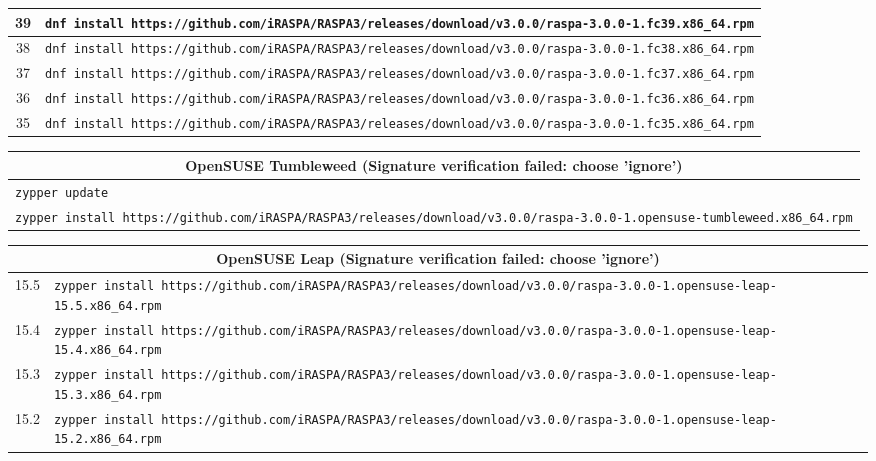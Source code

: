 \begin{table}[p]
\begin{tabularx}{\linewidth}{c|X}
     \hline
  39 & \verb+dnf install https://github.com/iRASPA/RASPA3/releases/download/v3.0.0/raspa-3.0.0-1.fc39.x86_64.rpm+\\
     \hline
  38 & \verb+dnf install https://github.com/iRASPA/RASPA3/releases/download/v3.0.0/raspa-3.0.0-1.fc38.x86_64.rpm+\\
     \hline
  37 & \verb+dnf install https://github.com/iRASPA/RASPA3/releases/download/v3.0.0/raspa-3.0.0-1.fc37.x86_64.rpm+\\
     \hline
  36 & \verb+dnf install https://github.com/iRASPA/RASPA3/releases/download/v3.0.0/raspa-3.0.0-1.fc36.x86_64.rpm+\\
     \hline
  35 & \verb+dnf install https://github.com/iRASPA/RASPA3/releases/download/v3.0.0/raspa-3.0.0-1.fc35.x86_64.rpm+\\
  \end{tabularx}
  \newline
\vspace*{0.5 cm}
\newline
  \begin{tabularx}{\linewidth}{X}
    \multicolumn{1}{c}{OpenSUSE Tumbleweed (Signature verification failed: choose 'ignore')}\\
   \hline
    \verb+zypper update+\\
    \verb+zypper install https://github.com/iRASPA/RASPA3/releases/download/v3.0.0/raspa-3.0.0-1.opensuse-tumbleweed.x86_64.rpm+\\
  \end{tabularx}
  \newline
\vspace*{0.5 cm}
\newline
  \begin{tabularx}{\linewidth}{c|X}
  \multicolumn{2}{c}{OpenSUSE Leap (Signature verification failed: choose 'ignore')}\\
   \hline
  15.5 & \verb+zypper install https://github.com/iRASPA/RASPA3/releases/download/v3.0.0/raspa-3.0.0-1.opensuse-leap-15.5.x86_64.rpm+\\
     \hline
  15.4 & \verb+zypper install https://github.com/iRASPA/RASPA3/releases/download/v3.0.0/raspa-3.0.0-1.opensuse-leap-15.4.x86_64.rpm+\\
     \hline
  15.3 & \verb+zypper install https://github.com/iRASPA/RASPA3/releases/download/v3.0.0/raspa-3.0.0-1.opensuse-leap-15.3.x86_64.rpm+\\
     \hline
  15.2 & \verb+zypper install https://github.com/iRASPA/RASPA3/releases/download/v3.0.0/raspa-3.0.0-1.opensuse-leap-15.2.x86_64.rpm+\\

\end{tabularx}
\end{table}
